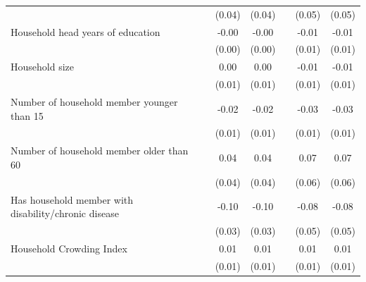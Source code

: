 {\begin{tabular}{l*{6}{c}}
                    &                     &      (0.04)         &      (0.04)         &                     &      (0.05)         &      (0.05)         \\
Household head years of education&                     &       -0.00         &       -0.00         &                     &       -0.01         &       -0.01         \\
                    &                     &      (0.00)         &      (0.00)         &                     &      (0.01)         &      (0.01)         \\
Household size      &                     &        0.00         &        0.00         &                     &       -0.01         &       -0.01         \\
                    &                     &      (0.01)         &      (0.01)         &                     &      (0.01)         &      (0.01)         \\
Number of household member younger than 15&                     &       -0.02\sym{**} &       -0.02\sym{**} &                     &       -0.03\sym{*}  &       -0.03\sym{*}  \\
                    &                     &      (0.01)         &      (0.01)         &                     &      (0.01)         &      (0.01)         \\
Number of household member older than 60&                     &        0.04         &        0.04         &                     &        0.07         &        0.07         \\
                    &                     &      (0.04)         &      (0.04)         &                     &      (0.06)         &      (0.06)         \\
Has household member with disability/chronic disease&                     &       -0.10\sym{**} &       -0.10\sym{**} &                     &       -0.08         &       -0.08         \\
                    &                     &      (0.03)         &      (0.03)         &                     &      (0.05)         &      (0.05)         \\
Household Crowding Index&                     &        0.01         &        0.01         &                     &        0.01         &        0.01         \\
                    &                     &      (0.01)         &      (0.01)         &                     &      (0.01)         &      (0.01)         \\

\end{tabular}}
